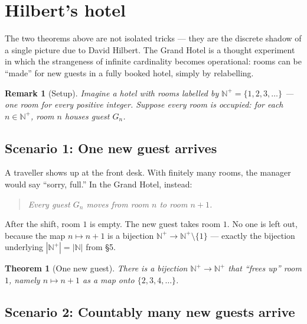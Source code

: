 \documentclass[11pt]{article}
\theoremstyle{defstyle}
\theoremstyle{thmstyle}
\newtheorem{theorem}{Theorem}[section]
\theoremstyle{notstyle}
\newtheorem*{remark}{Remark}
\theoremstyle{cautionstyle}
\newcommand{\N}{\mathbb{N}}
\newcommand{\Np}{\mathbb{N}^{+}}
\begin{document}
\section{Hilbert's hotel}

The two theorems above are not isolated tricks --- they are the discrete shadow of a single picture due to David Hilbert. The Grand Hotel is a thought experiment in which the strangeness of infinite cardinality becomes operational: rooms can be ``made'' for new guests in a fully booked hotel, simply by relabelling.

\begin{notebox}
\begin{remark}[Setup]
Imagine a hotel with rooms labelled by $\Np = \{1, 2, 3, \ldots\}$ --- one room for every positive integer. Suppose every room is occupied: for each $n \in \Np$, room $n$ houses guest $G_n$.
\end{remark}
\end{notebox}

\subsection*{Scenario 1: One new guest arrives}

A traveller shows up at the front desk. With finitely many rooms, the manager would say ``sorry, full.'' In the Grand Hotel, instead:

\begin{quote}
\emph{Every guest $G_n$ moves from room $n$ to room $n + 1$.}
\end{quote}

After the shift, room $1$ is empty. The new guest takes room $1$. No one is left out, because the map $n \mapsto n + 1$ is a bijection $\Np \to \Np \setminus \{1\}$ --- exactly the bijection underlying $|\Np| = |\N|$ from \S5.

\begin{thmbox}
\begin{theorem}[One new guest]
There is a bijection $\Np \to \Np$ that ``frees up'' room $1$, namely $n \mapsto n + 1$ as a map onto $\{2, 3, 4, \ldots\}$.
\end{theorem}
\end{thmbox}

\subsection*{Scenario 2: Countably many new guests arrive}
\end{document}
